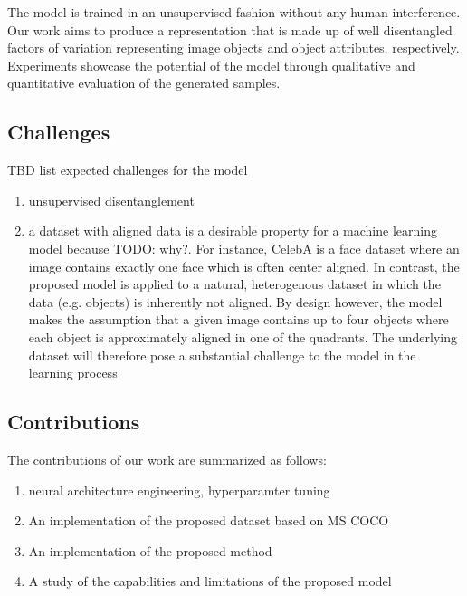 \documentclass[12pt,a4paper]{article}
\begin{document}
The model is trained in an unsupervised fashion without any human interference. Our work aims to produce a representation that is made up of well disentangled factors of variation representing image objects and object attributes, respectively. Experiments showcase the potential of the model through qualitative and quantitative evaluation of the generated samples.

\subsection{Challenges}
TBD list expected challenges for the model
\begin{enumerate}
  \item unsupervised disentanglement
  \item a dataset with aligned data is a desirable property for a machine learning model because TODO: why?. For instance, CelebA is a face dataset where an image contains exactly one face which is often center aligned. In contrast, the proposed model is applied to a natural, heterogenous dataset in which the data (e.g. objects) is inherently not aligned. By design however, the model makes the assumption that a given image contains up to four objects where each object is approximately aligned in one of the quadrants. The underlying dataset will therefore pose a substantial challenge to the model in the learning process
\end{enumerate}

\subsection{Contributions}
The contributions of our work are summarized as follows:
\begin{enumerate}
  \item neural architecture engineering, hyperparamter tuning
  \item An implementation of the proposed dataset based on MS COCO
  \item An implementation of the proposed method
  \item A study of the capabilities and limitations of the proposed model
\end{enumerate}
\end{document}
